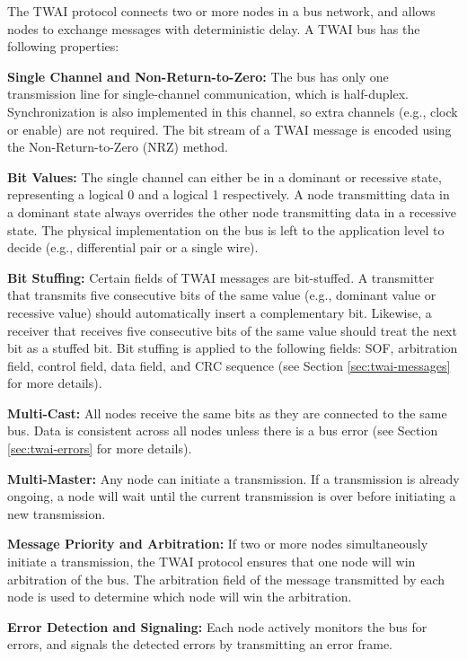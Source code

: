 \documentclass[main\_\_EN.tex]{subfiles}
\begin{document}
The TWAI protocol connects two or more nodes in a bus network, and allows nodes to exchange messages with deterministic delay. A TWAI bus has the following properties:

{\bfseries Single Channel and Non-Return-to-Zero:} The bus has only one transmission line for single-channel communication, which is half-duplex. Synchronization is also implemented in this channel, so extra channels (e.g., clock or enable) are not required. The bit stream of a TWAI message is encoded using the Non-Return-to-Zero (NRZ) method.

{\bfseries Bit Values:} The single channel can either be in a dominant or recessive state, representing a logical 0 and a logical 1 respectively. A node transmitting data in a dominant state always overrides the other node transmitting data in a recessive state. The physical implementation on the bus is left to the application level to decide (e.g., differential pair or a single wire).

{\bfseries Bit Stuffing:} Certain fields of TWAI messages are bit-stuffed. A transmitter that transmits five consecutive bits of the same value (e.g., dominant value or recessive value) should automatically insert a complementary bit. Likewise, a receiver that receives five consecutive bits of the same value should treat the next bit as a stuffed bit. Bit stuffing is applied to the following fields: SOF, arbitration field, control field, data field, and CRC sequence (see Section \ref{sec:twai-messages} for more details).

{\bfseries Multi-Cast:} All nodes receive the same bits as they are connected to the same bus. Data is consistent across all nodes unless there is a bus error (see Section \ref{sec:twai-errors} for more details).

{\bfseries Multi-Master:} Any node can initiate a transmission. If a transmission is already ongoing, a node will wait until the current transmission is over before initiating a new transmission.

{\bfseries Message Priority and Arbitration:} If two or more nodes simultaneously initiate a transmission, the TWAI protocol ensures that one node will win arbitration of the bus. The arbitration field of the message transmitted by each node is used to determine which node will win the arbitration.

{\bfseries Error Detection and Signaling: } Each node actively monitors the bus for errors, and signals the detected errors by transmitting an error frame.
\end{document}
